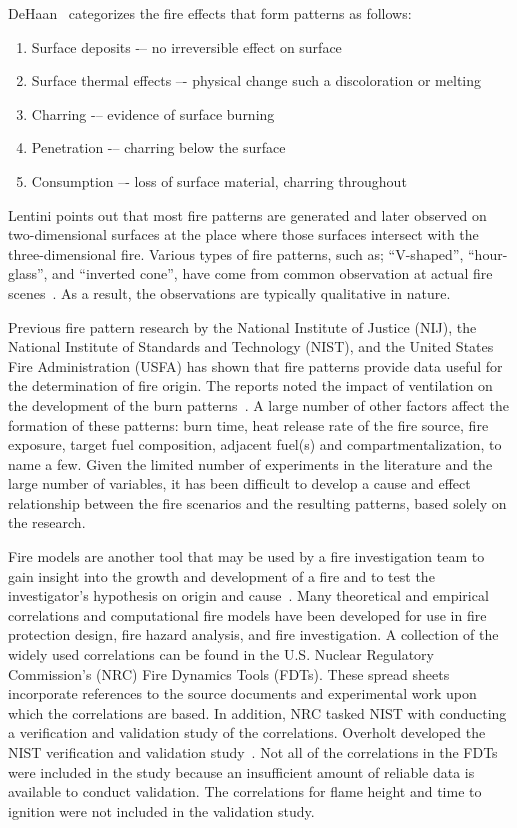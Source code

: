 \documentclass[twoside]{uocthesis}
\begin{document}
DeHaan~\cite{DeHaan:2012} categorizes the fire effects that form patterns as follows:
\begin{enumerate}
\item Surface deposits -– no irreversible effect on surface
\item Surface thermal effects –- physical change such a discoloration or melting
\item Charring -– evidence of surface burning
\item Penetration -– charring below the surface
\item Consumption –- loss of surface material, charring throughout
\end{enumerate}
Lentini points out that most fire patterns are generated and later observed on two-dimensional surfaces at the place where those surfaces intersect with the three-dimensional fire. Various types of fire patterns, such as; ``V-shaped'', ``hour-glass'', and ``inverted cone'', have come from common observation at actual fire scenes~\cite{Lentini:2006}.  As a result, the observations are typically qualitative in nature.

Previous fire pattern research by the National Institute of Justice (NIJ), the National Institute of Standards and Technology (NIST), and the United States Fire Administration (USFA) has shown that fire patterns provide data useful for the determination of fire origin.  The reports noted the impact of ventilation on the development of the burn patterns~\cite{Shanley:1997,Putorti:1997}. A large number of other factors affect the formation of these patterns: burn time, heat release rate of the fire source, fire exposure, target fuel composition, adjacent fuel(s) and compartmentalization, to name a few. Given the limited number of experiments in the literature and the large number of variables, it has been difficult to develop a cause and effect relationship between the fire scenarios and the resulting patterns, based solely on the research.  

Fire models are another tool that may be used by a fire investigation team to gain insight into the growth and development of a fire and to test the investigator’s hypothesis on origin and cause~\cite{Sutula:2001}.  Many theoretical and empirical correlations and computational fire models have been developed for use in fire protection design, fire hazard analysis, and fire investigation.  A collection of the widely used correlations can be found in the U.S. Nuclear Regulatory Commission’s (NRC) Fire Dynamics Tools (FDTs). These spread sheets incorporate references to the source documents and experimental work upon which the correlations are based. In addition, NRC tasked NIST with conducting a verification and validation study of the correlations. Overholt developed the NIST verification and validation study~\cite{Overholt:2014}. Not all of the correlations in the FDTs were included in the study because an insufficient amount of reliable data is available to conduct validation.  The correlations for flame height and time to ignition were not included in the validation study.
\end{document}
